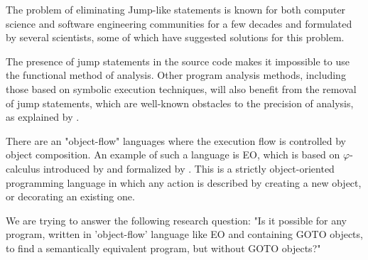 
The problem of eliminating Jump-like statements is known for both computer science and software engineering communities for a few decades and formulated by several scientists, some of which have suggested solutions for this problem.

The presence of jump statements in the source code makes it impossible to use the functional method of analysis.
Other program analysis methods, including those based on symbolic execution techniques, will also benefit from the removal of jump statements, which are well-known obstacles to the precision of analysis, as explained by \citet{baldoni2018survey}.

There are an "object-flow" languages where the execution flow is controlled by object composition.
An example of such a language is EO, which is based on $\varphi$-calculus introduced by \citet{bugayenko2021eolang} and formalized by \citet{kudasov2021}.
This is a strictly object-oriented programming language in which any action is described by creating a new object, or decorating an existing one.

We are trying to answer the following research question: "Is it possible for any program, written in 'object-flow' language like EO and containing GOTO objects, to find a semantically equivalent program, but without GOTO objects?"

